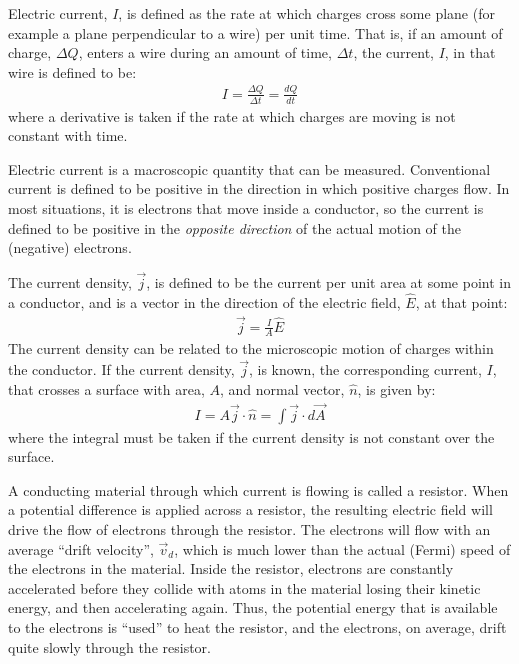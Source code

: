 \begin{chapterSummary}
Electric current, $I$, is defined as the rate at which charges cross some plane (for example a plane perpendicular to a wire) per unit time. That is, if an amount of charge, $\Delta Q$, enters a wire during an amount of time, $\Delta t$, the current, $I$, in that wire is defined to be:
\begin{align*}
I=\frac{\Delta Q}{\Delta t}=\frac{dQ}{dt}
\end{align*}
where a derivative is taken if the rate at which charges are moving is not constant with time.

Electric current is a macroscopic quantity that can be measured. Conventional current is defined to be positive in the direction in which positive charges flow. In most situations, it is electrons that move inside a conductor, so the current is defined to be positive in the \textit{opposite direction} of the actual motion of the (negative) electrons.

The current density, $\vec j$, is defined to be the current per unit area at some point in a conductor, and is a vector in the direction of the electric field, $\hat E$, at that point:
\begin{align*}
\vec j = \frac{I}{A}\hat E
\end{align*}
The current density can be related to the microscopic motion of charges within the conductor. If the current density, $\vec j$, is known, the corresponding current, $I$, that crosses a surface with area, $A$, and normal vector, $\hat n$, is given by:
\begin{align*}
I=A \vec j\cdot \hat n=\int \vec j \cdot d\vec A
\end{align*}
where the integral must be taken if the current density is not constant over the surface.

A conducting material through which current is flowing is called a resistor. When a potential difference is applied across a resistor, the resulting electric field will drive the flow of electrons through the resistor. The electrons will flow with an average ``drift velocity'', $\vec v_d$, which is much lower than the actual (Fermi) speed of the electrons in the material. Inside the resistor, electrons are constantly accelerated before they collide with atoms in the material losing their kinetic energy, and then accelerating again. Thus, the potential energy that is available to the electrons is ``used'' to heat the resistor, and the electrons, on average, drift quite slowly through the resistor.


\end{chapterSummary}
